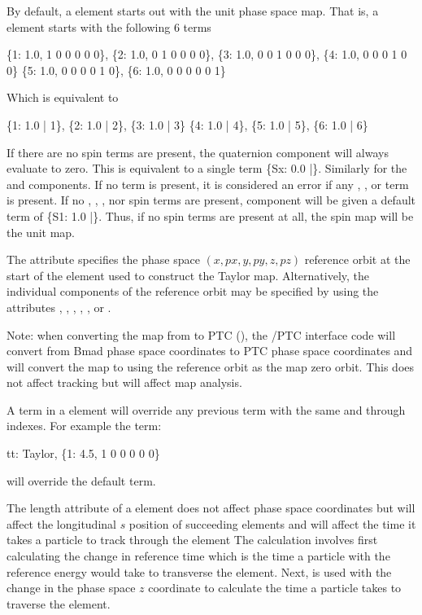 {By default, a  element starts out with the unit phase space map.  That is, a 
element starts with the following 6 terms
\begin{example}
  \{1: 1.0, 1 0 0 0 0 0\}, \{2: 1.0, 0 1 0 0 0 0\},
  \{3: 1.0, 0 0 1 0 0 0\}, \{4: 1.0, 0 0 0 1 0 0\}
  \{5: 1.0, 0 0 0 0 1 0\}, \{6: 1.0, 0 0 0 0 0 1\}
\end{example}
Which is equivalent to
\begin{example}
  \{1: 1.0 | 1\}, \{2: 1.0 | 2\}, \{3: 1.0 | 3\}
  \{4: 1.0 | 4\}, \{5: 1.0 | 5\}, \{6: 1.0 | 6\}
\end{example}

If there are no  spin terms are present, the  quaternion component will always
evaluate to zero.  This is equivalent to a single term \{Sx: 0.0 |\}.  Similarly for the  and
 components. If no  term is present, it is considered an error if any ,
, or  term is present. If no , , , nor  spin terms are
present,  component will be given a default term of \{S1: 1.0 |\}. Thus, if no spin terms are
present at all, the spin map will be the unit map.

The  attribute specifies the phase space $(x, px, y, py, z, pz)$ reference
orbit at the start of the element used to construct the Taylor map. Alternatively, the
individual components of the reference orbit may be specified by using the attributes 
, , , , , or .

Note: when converting the map from \bmad to PTC (), the \bmad/PTC interface
code will convert from Bmad phase space coordinates to PTC phase space coordinates and
will convert the map to using the reference orbit as the map zero orbit. This does not
affect tracking but will affect map analysis.

A term in a  element will override any previous term
with the same  and  through  indexes. For example the term:
\begin{example}
  tt: Taylor, \{1: 4.5, 1 0 0 0 0 0\} 
\end{example}
will override the default  term.

The  length attribute of a  element does not affect phase space coordinates but
will affect the longitudinal $s$ position of succeeding elements and will affect the time it takes a
particle to track through the element The calculation involves first calculating the change in
reference time which is the time a particle with the reference energy would take to transverse the
element. Next,  is used with the change in the phase space $z$ coordinate to calculate
the time a particle takes to traverse the element.

}

